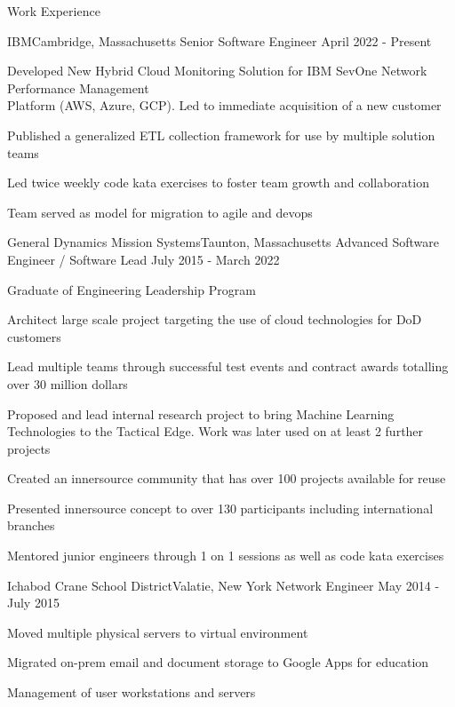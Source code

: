 \documentclass{resume} %
\begin{document}
\begin{rSection}{Work Experience}

\begin{rSubsection}{IBM}{Cambridge, Massachusetts}
{Senior Software Engineer}
{April 2022 - Present}
\item Developed New Hybrid Cloud Monitoring Solution for IBM SevOne Network Performance Management \\
Platform (AWS, Azure, GCP). Led to immediate acquisition of a new customer
\item Published a generalized ETL collection framework for use by multiple solution teams
\item Led twice weekly code kata exercises to foster team growth and collaboration
\item Team served as model for migration to agile and devops
\end{rSubsection}

\begin{rSubsection}{General Dynamics Mission Systems}{Taunton, Massachusetts}
{Advanced Software Engineer / Software Lead}
{July 2015 - March 2022}
 \item Graduate of Engineering Leadership Program
 \item Architect large scale project targeting the use of cloud technologies for DoD customers
 \item Lead multiple teams through successful test events and contract awards totalling over 30 million dollars
 \item Proposed and lead internal research project to bring  Machine Learning Technologies to the Tactical Edge. Work was later used on at least 2 further projects
 \item Created an innersource community that has over 100 projects available for reuse
 \item Presented innersource concept to over 130 participants including international branches
 \item Mentored junior engineers through 1 on 1 sessions as well as code kata exercises
\end{rSubsection}

\begin{rSubsection}{Ichabod Crane School District}{Valatie, New York}
{Network Engineer}
{ May 2014 - July 2015}
\item Moved multiple physical servers to virtual environment
\item Migrated on-prem email and document storage to Google Apps for education
\item Management of user workstations and servers

\end{rSubsection}

\end{rSection}
\end{document}
